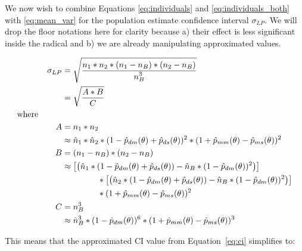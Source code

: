 We now wish to combine Equations \eqref{eq:individuals} and \eqref{eq:individuals_both} with \eqref{eq:mean_var} for the population estimate confidence interval $\sigma_{LP}$.  We will drop the floor notations here for clarity because a) their effect is less significant inside the radical and b) we are already manipulating approximated values.

\begin{align} \label{eq:ci}
    \begin{split}
        \sigma_{LP} &= \sqrt{\ddfrac{n_{1}*n_{2}*(n_{1} - n_{B})*(n_{2} - n_{B})}{n^3_{B}}} \\
        &= \sqrt{\ddfrac{A*B}{C}} \\
        \text{where} \hspace{1cm} & \\
        A &= n_{1}*n_{2} \\
        &\approx \hat{n}_{1} * \hat{n}_{2} * (1 - \hat{p}_{dm}(\theta) + \hat{p}_{ds}(\theta))^2 * (1 + \hat{p}_{mm}(\theta) - \hat{p}_{ms}(\theta))^2 \\
        \vspace{2mm}
        B &= (n_{1} - n_{B})*(n_{2} - n_{B}) \\
        &\approx \left[ \left(\hat{n}_{1} * (1 - \hat{p}_{dm}(\theta) + \hat{p}_{ds}(\theta)) - \hat{n}_{B} * (1 - \hat{p}_{dm}(\theta))^2 \right) \right]  \\
        & \hspace{1.5cm} * \left[ \left(\hat{n}_{2} * (1 - \hat{p}_{dm}(\theta) + \hat{p}_{ds}(\theta)) - \hat{n}_{B} * (1 - \hat{p}_{dm}(\theta))^2 \right)  \right] \\
        & \hspace{1.5cm} * (1 + \hat{p}_{mm}(\theta) - \hat{p}_{ms}(\theta))^2 \\
        \vspace{2mm}
        C &= n^3_{B} \\
        &\approx \hat{n}_{B}^3 * (1 - \hat{p}_{dm}(\theta))^6 * (1 + \hat{p}_{mm}(\theta) - \hat{p}_{ms}(\theta))^3
    \end{split}
\end{align}

\newpage

\noindent This means that the approximated CI value from Equation~\eqref{eq:ci} simplifies to:

